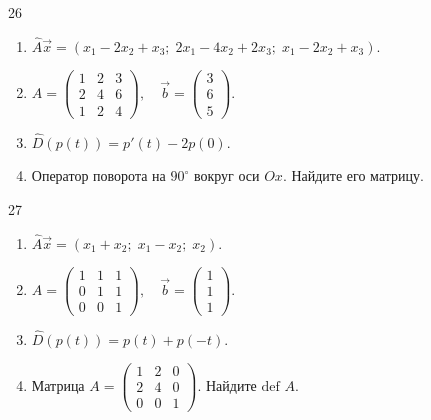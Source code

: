 \documentclass[12pt,a4paper]{article}
\theoremstyle{plain}
\theoremstyle{definition}
\begin{document}
\begin{taskbox}{26}
    \begin{enumerate}
        \item $\hat{A}\vec{x} = (x_1 - 2x_2 + x_3; \; 2x_1 - 4x_2 + 2x_3; \; x_1 - 2x_2 + x_3)$.
        \item $A = \begin{pmatrix} 1 & 2 & 3 \\ 2 & 4 & 6 \\ 1 & 2 & 4 \end{pmatrix}, \quad \vec{b} = \begin{pmatrix} 3 \\ 6 \\ 5 \end{pmatrix}$.
        \item $\hat{D}(p(t)) = p'(t) - 2p(0)$.
        \item Оператор поворота на $90^\circ$ вокруг оси $Ox$. Найдите его матрицу.
    \end{enumerate}
\end{taskbox}

\begin{taskbox}{27}
    \begin{enumerate}
        \item $\hat{A}\vec{x} = (x_1 + x_2; \; x_1 - x_2; \; x_2)$.
        \item $A = \begin{pmatrix} 1 & 1 & 1 \\ 0 & 1 & 1 \\ 0 & 0 & 1 \end{pmatrix}, \quad \vec{b} = \begin{pmatrix} 1 \\ 1 \\ 1 \end{pmatrix}$.
        \item $\hat{D}(p(t)) = p(t) + p(-t)$.
        \item Матрица $A = \begin{pmatrix} 1 & 2 & 0 \\ 2 & 4 & 0 \\ 0 & 0 & 1 \end{pmatrix}$. Найдите $\text{def } A$.
    \end{enumerate}
\end{taskbox}
\end{document}
